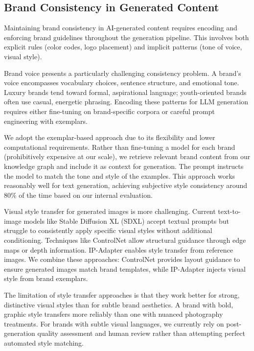 \documentclass[11pt, twocolumn]{article}
\begin{document}
\subsection{Brand Consistency in Generated Content}

Maintaining brand consistency in AI-generated content requires encoding and enforcing brand guidelines throughout the generation pipeline. This involves both explicit rules (color codes, logo placement) and implicit patterns (tone of voice, visual style).

Brand voice presents a particularly challenging consistency problem. A brand's voice encompasses vocabulary choices, sentence structure, and emotional tone. Luxury brands tend toward formal, aspirational language; youth-oriented brands often use casual, energetic phrasing. Encoding these patterns for LLM generation requires either fine-tuning on brand-specific corpora or careful prompt engineering with exemplars.

We adopt the exemplar-based approach due to its flexibility and lower computational requirements. Rather than fine-tuning a model for each brand (prohibitively expensive at our scale), we retrieve relevant brand content from our knowledge graph and include it as context for generation. The prompt instructs the model to match the tone and style of the examples. This approach works reasonably well for text generation, achieving subjective style consistency around 80\% of the time based on our internal evaluation.

Visual style transfer for generated images is more challenging. Current text-to-image models like Stable Diffusion XL (SDXL) accept textual prompts but struggle to consistently apply specific visual styles without additional conditioning. Techniques like ControlNet allow structural guidance through edge maps or depth information. IP-Adapter enables style transfer from reference images. We combine these approaches: ControlNet provides layout guidance to ensure generated images match brand templates, while IP-Adapter injects visual style from brand exemplars.

The limitation of style transfer approaches is that they work better for strong, distinctive visual styles than for subtle brand aesthetics. A brand with bold, graphic style transfers more reliably than one with nuanced photography treatments. For brands with subtle visual languages, we currently rely on post-generation quality assessment and human review rather than attempting perfect automated style matching.
\end{document}

